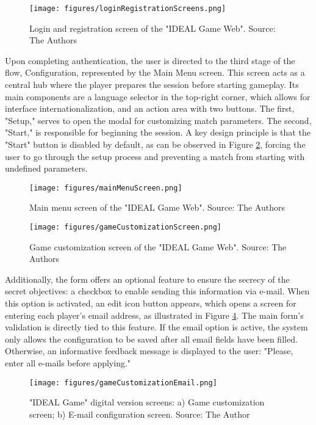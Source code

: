 \documentclass[english]{sbc2025}
\begin{document}
\begin{figure}[h]
  \centering
  \texttt{[image: figures/loginRegistrationScreens.png]}
  \caption{Login and registration screen of the "IDEAL Game Web". Source: The Authors}
  \label{fig_loginRegistrationScreens}
\end{figure}

Upon completing authentication, the user is directed to the third stage of the flow, Configuration, represented by the Main Menu screen. This screen acts as a central hub where the player prepares the session before starting gameplay. Its main components are a language selector in the top-right corner, which allows for interface internationalization, and an action area with two buttons. The first, "Setup," serves to open the modal for customizing match parameters. The second, "Start," is responsible for beginning the session. A key design principle is that the "Start" button is disabled by default, as can be observed in Figure \ref{fig_mainMenuScreen}, forcing the user to go through the setup process and preventing a match from starting with undefined parameters.

\begin{figure}[h]
  \centering
  \texttt{[image: figures/mainMenuScreen.png]}
  \caption{Main menu screen of the "IDEAL Game Web". Source: The Authors}
  \label{fig_mainMenuScreen}
\end{figure}


\begin{figure}[h]
  \centering
  \texttt{[image: figures/gameCustomizationScreen.png]}
  \caption{Game customization screen of the "IDEAL Game Web". Source: The Authors}
  \label{fig_gameCustomizationScreen}
\end{figure}

Additionally, the form offers an optional feature to ensure the secrecy of the secret objectives: a checkbox to enable sending this information via e-mail. When this option is activated, an edit icon button appears, which opens a screen for entering each player's email address, as illustrated in Figure \ref{fig_gameCustomizationEmail}. The main form's validation is directly tied to this feature. If the email option is active, the system only allows the configuration to be saved after all email fields have been filled. Otherwise, an informative feedback message is displayed to the user: "Please, enter all e-mails before applying."

\begin{figure}[h]
  \centering
  \texttt{[image: figures/gameCustomizationEmail.png]}
  \caption{ "IDEAL Game" digital version screens: a) Game customization screen; b) E-mail configuration screen. Source: The Author}
  \label{fig_gameCustomizationEmail}
\end{figure}
\end{document}
